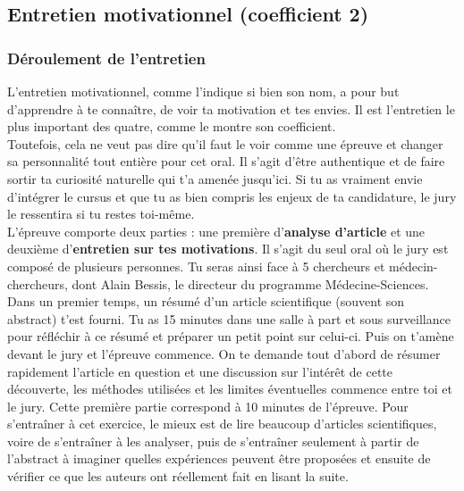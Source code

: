 \subsection{Entretien motivationnel (coefficient 2)}

\subsubsection{Déroulement de l'entretien}

L’entretien motivationnel, comme l’indique si bien son nom, a pour but d’apprendre à te connaître, de voir ta motivation et tes envies. Il est l’entretien le plus important des quatre, comme le montre son coefficient.\\

Toutefois, cela ne veut pas dire qu’il faut le voir comme une épreuve et changer sa personnalité tout entière pour cet oral. Il s’agit d’être authentique et de faire sortir ta curiosité naturelle qui t'a amenée jusqu’ici. Si tu as vraiment envie d’intégrer le cursus et que tu as bien compris les enjeux de ta candidature, le jury le ressentira si tu restes toi-même.\\

L’épreuve comporte deux parties : une première d’\textbf{analyse d’article} et une deuxième d’\textbf{entretien sur tes motivations}. Il s’agit du seul oral où le jury est composé de plusieurs personnes. Tu seras ainsi face à 5 chercheurs et médecin-chercheurs, dont Alain Bessis, le directeur du programme Médecine-Sciences.\\

Dans un premier temps, un résumé d’un article scientifique (souvent son abstract) t'est fourni. Tu as 15 minutes dans une salle à part et sous surveillance pour réfléchir à ce résumé et préparer un petit point sur celui-ci. Puis on t'amène devant le jury et l’épreuve commence. On te demande tout d’abord de résumer rapidement l’article en question et une discussion sur l’intérêt de cette découverte, les méthodes utilisées et les limites éventuelles commence entre toi et le jury. Cette première partie correspond à 10 minutes de l’épreuve. Pour s’entraîner à cet exercice, le mieux est de lire beaucoup d’articles scientifiques, voire de s’entraîner à les analyser, puis de s’entraîner seulement à partir de l’abstract à imaginer quelles expériences peuvent être proposées et ensuite de vérifier ce que les auteurs ont réellement fait en lisant la suite.\\

